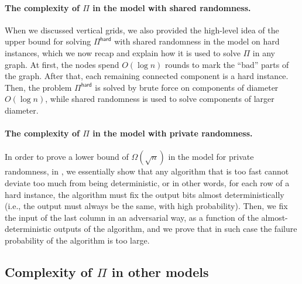 \documentclass[11pt]{article}
\newcommand{\lhard}{\mathsf {hard}}
\begin{document}
\paragraph{\boldmath The complexity of $\Pi$ in the \local model with shared randomness.}
When we discussed vertical grids, we also provided the high-level idea of the upper bound for solving $\Pi^{\lhard}$ with shared randomness in the \local model on hard instances, which we now recap and explain how it is used to solve $\Pi$ in any graph. At first, the nodes spend $O(\log n)$ rounds to mark the ``bad'' parts of the graph. After that, each remaining connected component is a hard instance. Then, the problem $\Pi^{\lhard}$ is solved by brute force on components of diameter $O(\log n)$, while shared randomness is used to solve components of larger diameter.

\paragraph{\boldmath The complexity of $\Pi$ in the \local model with private randomness.}
In order to prove a lower bound of $\Omega(\sqrt{n})$ in the \local model for private randomness, in , we essentially show that any algorithm that is too fast cannot deviate too much from being deterministic, or in other words, for each row of a hard instance, the algorithm must fix the output bits almost deterministically (i.e., the output must always be the same, with high probability). Then, we fix the input of the last column in an adversarial way, as a function of the almost-deterministic outputs of the algorithm, and we prove that in such case the failure probability of the algorithm is too large.

\subsection{Complexity of \texorpdfstring{\boldmath$\Pi$}{Pi} in other models}
\end{document}
